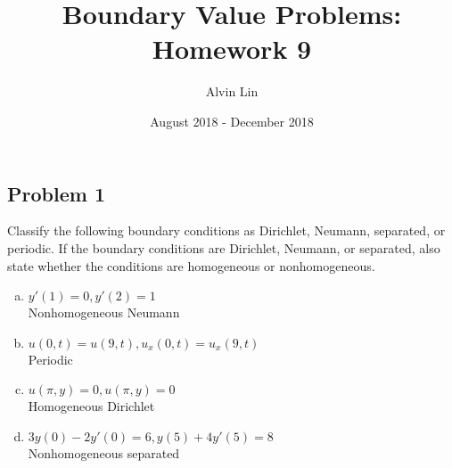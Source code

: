 \documentclass{math}
\title{Boundary Value Problems: Homework 9}
\author{Alvin Lin}
\date{August 2018 - December 2018}
\begin{document}
\maketitle

\subsection*{Problem 1}
Classify the following boundary conditions as Dirichlet, Neumann, separated, or
periodic. If the boundary conditions are Dirichlet, Neumann, or separated, also
state whether the conditions are homogeneous or nonhomogeneous.
\begin{enumerate}[(a)]
  \item \( y'(1) = 0, y'(2) = 1 \) \\
  Nonhomogeneous Neumann
  \item \( u(0,t) = u(9,t), u_x(0,t) = u_x(9,t) \) \\
  Periodic
  \item \( u(\pi,y) = 0, u(\pi,y) = 0 \) \\
  Homogeneous Dirichlet
  \item \( 3y(0)-2y'(0) = 6, y(5)+4y'(5) = 8 \) \\
  Nonhomogeneous separated
\end{enumerate}
\end{document}
